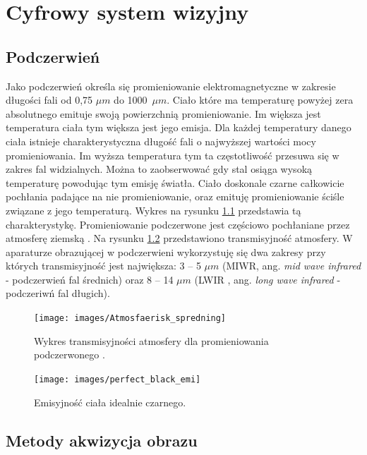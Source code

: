 \chapter{Cyfrowy system wizyjny}
\label{cha:csw}

\section{Podczerwień}

Jako podczerwień określa się promieniowanie elektromagnetyczne w zakresie długości fali od  0,75 $\mu m$ do 1000~$\mu m$. Ciało które ma temperaturę powyżej zera absolutnego emituje swoją powierzchnią promieniowanie. Im większa jest temperatura ciała tym większa jest jego emisja. Dla każdej temperatury danego ciała istnieje charakterystyczna długość fali o najwyższej wartości mocy promieniowania. Im wyższa temperatura tym ta częstotliwość przesuwa się w zakres fal widzialnych. Można to zaobserwować gdy stal osiąga wysoką temperaturę powodując tym emisję światła. Ciało doskonale czarne całkowicie pochłania padające na nie promieniowanie, oraz emituję promieniowanie ściśle związane z jego temperaturą. Wykres na rysunku \ref{fig:perfect_black}  przedstawia tą charakterystykę. Promieniowanie podczerwone jest częściowo pochłaniane przez atmosferę ziemską . Na rysunku  \ref{fig:atmosfera_int} przedstawiono transmisyjność atmosfery. W aparaturze obrazującej w podczerwieni wykorzystuję się dwa zakresy przy których transmisyjność jest największa:  3 -- 5 $\mu m$ (MIWR, ang. \textit{mid wave infrared} - podczerwień fal średnich) oraz  8 -- 14 $\mu m$ (LWIR , ang. \textit{long wave infrared} - podczeriwń fal długich)\cite{niklaus2007mems}.

\begin{figure}
\centering
\texttt{[image: images/Atmosfaerisk\_spredning]}
\caption[Wykres transmisyjności atmosfery dla promieniowania podczerwonego ]{Wykres transmisyjności atmosfery dla promieniowania podczerwonego \cite{wiki:infrared}.}
\label{fig:perfect_black}
\end{figure}

\begin{figure}
\centering
\texttt{[image: images/perfect\_black\_emi]}
\caption[Emisyjność ciała idealnie czarnego]{Emisyjność ciała idealnie czarnego.}
\label{fig:atmosfera_int}
\end{figure}

\section{Metody akwizycja obrazu}

